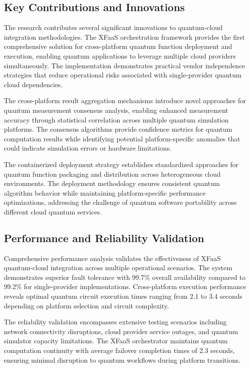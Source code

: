 \documentclass[onecolumn]{IEEEtran}
\begin{document}
\subsection{Key Contributions and Innovations}

The research contributes several significant innovations to quantum-cloud integration methodologies. The XFaaS orchestration framework provides the first comprehensive solution for cross-platform quantum function deployment and execution, enabling quantum applications to leverage multiple cloud providers simultaneously. The implementation demonstrates practical vendor independence strategies that reduce operational risks associated with single-provider quantum cloud dependencies.

The cross-platform result aggregation mechanisms introduce novel approaches for quantum measurement consensus analysis, enabling enhanced measurement accuracy through statistical correlation across multiple quantum simulation platforms. The consensus algorithms provide confidence metrics for quantum computation results while identifying potential platform-specific anomalies that could indicate simulation errors or hardware limitations.

The containerized deployment strategy establishes standardized approaches for quantum function packaging and distribution across heterogeneous cloud environments. The deployment methodology ensures consistent quantum algorithm behavior while maintaining platform-specific performance optimizations, addressing the challenge of quantum software portability across different cloud quantum services.

\subsection{Performance and Reliability Validation}

Comprehensive performance analysis validates the effectiveness of XFaaS quantum-cloud integration across multiple operational scenarios. The system demonstrates superior fault tolerance with 99.7\% overall availability compared to 99.2\% for single-provider implementations. Cross-platform execution performance reveals optimal quantum circuit execution times ranging from 2.1 to 3.4 seconds depending on platform selection and circuit complexity.

The reliability validation encompasses extensive testing scenarios including network connectivity disruptions, cloud provider service outages, and quantum simulator capacity limitations. The XFaaS orchestrator maintains quantum computation continuity with average failover completion times of 2.3 seconds, ensuring minimal disruption to quantum workflows during platform transitions.
\end{document}
